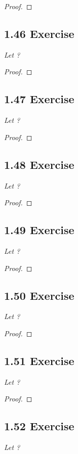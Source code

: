 \documentclass{article}
\begin{document}
\begin{proof}
\end{proof}

\subsection*{1.46 Exercise} 
\quad \textit{Let ?}

\begin{proof}
\end{proof}

\subsection*{1.47 Exercise} 
\quad \textit{Let ?}

\begin{proof}
\end{proof}

\subsection*{1.48 Exercise} 
\quad \textit{Let ?}

\begin{proof}
\end{proof}

\subsection*{1.49 Exercise} 
\quad \textit{Let ?}

\begin{proof}
\end{proof}

\subsection*{1.50 Exercise} 
\quad \textit{Let ?}

\begin{proof}
\end{proof}

\subsection*{1.51 Exercise} 
\quad \textit{Let ?}

\begin{proof}
\end{proof}

\subsection*{1.52 Exercise} 
\quad \textit{Let ?}
\end{document}
